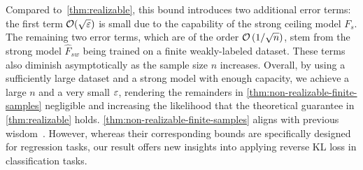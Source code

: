 Compared to~\cref{thm:realizable}, this bound introduces two additional error terms: the first term $\mathcal{O}(\sqrt{\varepsilon})$ is small due to the capability of the strong ceiling model $F_s$.
The remaining two error terms, which are of the order $\mathcal{O} \left( 1/\sqrt{n} \right)$, stem from the strong model $\hat{F}_{sw}$ being trained on a finite weakly-labeled dataset. 
These terms also diminish asymptotically as the sample size $n$ increases.
Overall, by using a sufficiently large dataset and a strong model with enough capacity, we achieve a large $n$ and a very small $\varepsilon$, rendering the remainders in \cref{thm:non-realizable-finite-samples} negligible and increasing the likelihood that the theoretical guarantee in \cref{thm:realizable} holds.
\cref{thm:non-realizable-finite-samples} aligns with previous wisdom~\citep{charikar2024quantifying,yao2025understanding}. 
However, whereas their corresponding bounds are specifically designed for regression tasks, our result offers new insights into applying reverse KL loss in classification tasks.








